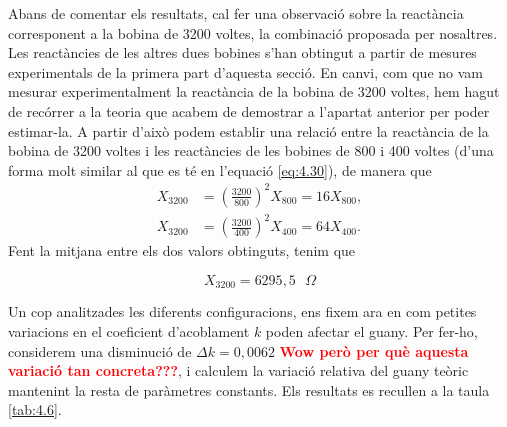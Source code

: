 \documentclass[a4paper,10.5pt]{report}
\begin{document}
Abans de comentar els resultats, cal fer una observació sobre la reactància corresponent a la bobina de 3200 voltes, la combinació proposada per nosaltres. Les reactàncies de les altres dues bobines s'han obtingut a partir de mesures experimentals de la primera part d'aquesta secció. En canvi, com que no vam mesurar experimentalment la reactància de la bobina de 3200 voltes, hem hagut de recórrer a la teoria que acabem de demostrar a l'apartat anterior per poder estimar-la. A partir d'això podem establir una relació entre la reactància de la bobina de 3200 voltes i les reactàncies de les bobines de 800 i 400 voltes (d'una forma molt similar al que es té en l'equació \eqref{eq:4.30}), de manera que
\begin{align*}
	X_{3200}  &= \left(\frac{3200}{800}\right)^2 X_{800} = 16 X_{800},  \\
	X_{3200}  &= \left(\frac{3200}{400}\right)^2 X_{400} = 64 X_{400}. 
\end{align*}
Fent la mitjana entre els dos valors obtinguts, tenim que 

\begin{equation}
	X_{3200} = 6295,5 \text{ $\Omega$}
\end{equation}

Un cop analitzades les diferents configuracions, ens fixem ara en com petites variacions en el coeficient d’acoblament $k$ poden afectar el guany. Per fer-ho, considerem una disminució de $\Delta k = 0{,}0062$ \textbf{\textcolor{red}{Wow però per què aquesta variació tan concreta???}}, i calculem la variació relativa del guany teòric mantenint la resta de paràmetres constants. Els resultats es recullen a la taula \ref{tab:4.6}.
\end{document}
